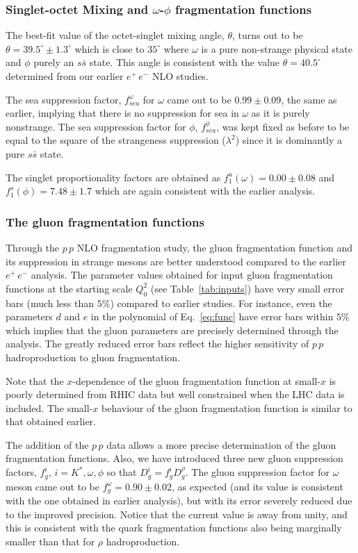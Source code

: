 \documentclass{ws-ijmpa}
\def\tta{{\theta}}
\def\om{{\omega}}
\def\ph{{\phi}}
\begin{document}
\subsubsection{Singlet-octet Mixing and $\omega$-$\phi$ fragmentation
functions}
\label{Mixing}
The best-fit value of the octet-singlet mixing angle, $\tta$, turns out
to be $\theta = 39.5^\circ \pm 1.3^\circ$ which is close to $35^\circ$
where $\om$ is a pure non-strange physical state\cite{Yao} and $\phi$
purely an $s\bar{s}$ state.  This angle is consistent with the value
$\tta=40.5^\circ$ determined from our earlier $e^+\,e^-$ NLO
studies\cite{Savinlo}.

The sea suppression factor, $f_{sea}^{\om}$ for $\om$ came out
to be $0.99 \pm 0.09$, the same as earlier, implying that there is no
suppression for sea in $\omega$ as it is purely nonstrange. The sea
suppression factor for $\phi$, $f_{sea}^{\phi}$, was kept fixed as before
to be equal to the square of the strangeness suppression ($\lambda ^2$)
since it is dominantly a pure $s \bar{s}$ state.

The singlet proportionality factors are obtained as $f_1^u(\om) = 0.00
\pm 0.08$ and $f_1^s(\ph)=7.48 \pm 1.7$ which are again consistent with
the earlier analysis.

\subsubsection{The gluon fragmentation functions}
\label{Gffns}
Through the $p\,p$ NLO fragmentation study, the gluon fragmentation
function and its suppression in strange mesons are better understood
compared to the earlier $e^+\,e^-$ analysis. The parameter values obtained
for input gluon fragmentation functions at the starting scale $Q_0^2$
(see Table~\ref{tab:inputs}) have very small error bars (much less than
$5\%$) compared to earlier studies\cite{Savilo,Savinlo}. For instance,
even the parameters $d$ and $e$ in the polynomial of Eq.~\ref{eq:func}
have error bars within $5\%$ which implies that the gluon parameters
are precisely determined through the analysis. The greatly reduced error
bars reflect the higher sensitivity of $p\,p$ hadroproduction to gluon
fragmentation.

Note that the $x$-dependence of the gluon fragmentation function at
small-$x$ is poorly determined from RHIC data but well constrained when
the LHC data is included. The small-$x$
behaviour of the gluon fragmentation function is similar to that
obtained earlier.

The addition of the $p\,p$ data allows a more precise determination of
the gluon fragmentation functions. Also, we have introduced three new
gluon suppression factors, $f_g^i$, $i= K^*,\om, \phi$ so that $D_g^i =
f_g^i D_g^{\rho}$. The gluon suppression factor for $\omega$ meson came
out to be $f_g^{\om} = 0.90 \pm 0.02$, as expected (and its value is
consistent with the one obtained in earlier analysis\cite{Savinlo}), but with
its error severely reduced due to the improved precision. Notice that
the current value is away from unity, and this is consistent with the
quark fragmentation functions also being marginally smaller than that
for $\rho$ hadroproduction. 
\end{document}
